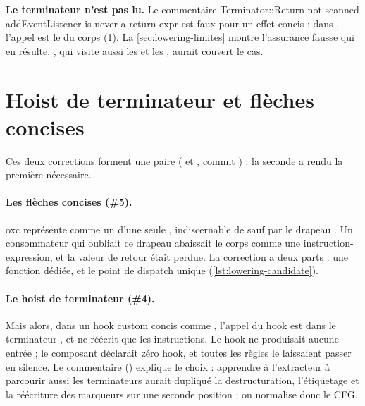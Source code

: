 \begin{piege}
\textbf{Le terminateur n'est pas lu.} Le commentaire \og Terminator::Return not scanned addEventListener is never a return expr\fg{} est faux pour un effet concis : dans , l'appel est le  du corps (\cref{sec:lowering-hoist}). La \cref{sec:lowering-limites} montre l'assurance fausse qui en résulte. , qui visite aussi les  et les , aurait couvert le cas.
\end{piege}

\section{Hoist de terminateur et flèches concises}
\label{sec:lowering-hoist}

Ces deux corrections forment une paire ( et , commit ) : la seconde a rendu la première nécessaire.

\paragraph{Les flèches concises (\#5).} oxc représente  comme un  d'une seule , indiscernable de  sauf par le drapeau . Un consommateur qui oubliait ce drapeau abaissait le corps comme une instruction-expression, et la valeur de retour était perdue. La correction a deux parts : une fonction dédiée, et le point de dispatch unique  (\cref{lst:lowering-candidate}).


\paragraph{Le hoist de terminateur (\#4).} Mais alors, dans un hook custom concis comme , l'appel du hook est dans le terminateur , et  ne réécrit que les instructions. Le hook ne produisait aucune entrée ; le composant déclarait zéro hook, et toutes les règles le laissaient passer en silence. Le commentaire () explique le choix : apprendre à l'extracteur à parcourir aussi les terminateurs aurait dupliqué la destructuration, l'étiquetage et la réécriture des marqueurs sur une seconde position ; on normalise donc le CFG.

